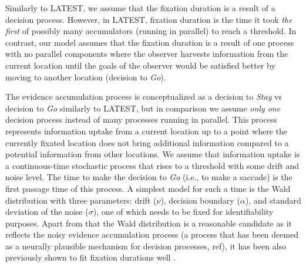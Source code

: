 \documentclass{article}
\begin{document}
Similarly to LATEST, we assume that the fixation duration is a result of a decision process. However, in LATEST, fixation duration is the time it took \textit{the first} of possibly many accumulators (running in parallel) to reach a threshold. In contrast, our model assumes that the fixation duration is a result of one process with no parallel components where the observer harvests information from the current location until the goals of the observer would be satisfied better by moving to another location (decision to \textit{Go}).

The evidence accumulation process is conceptualized as a decision to \textit{Stay} vs decision to \textit{Go} similarly to LATEST, but in comparison we assume \textit{only one} decision process instead of many processes running in parallel. This process represents information uptake from a current location up to a point where the currently fixated location does not bring additional information compared to a potential information from other locations. We assume that information uptake is a continuous-time stochastic process that rises to a threshold with some drift and noise level. The time to make the decision to \textit{Go} (i.e., to make a saccade) is the first passage time of this process. A simplest model for such a time is the Wald distribution with three parameters: drift ($\nu$), decision boundary ($\alpha$), and standard deviation of the noise ($\sigma$), one of which needs to be fixed for identifiability purposes. Apart from that the Wald distribution is a reasonable candidate as it reflects the noisy evidence accumulation process (a process that has been deemed as a neurally plausible mechanism for decision processes, ref), it has been also previously shown to fit fixation durations well \citep{palmer2011shapes}.
\end{document}
